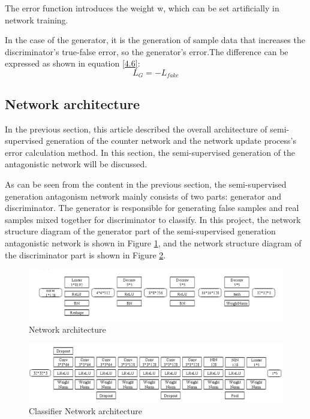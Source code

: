 \documentclass[11pt,en]{elegantpaper}
\begin{document}
The error function introduces the weight w, which can be set artificially in network training.

In the case of the generator, it is the generation of sample data that increases the discriminator's true-false error, so the generator's error.The difference can be expressed as shown in equation \ref{4.6}:
\begin{equation}
	L_G=-L_{fake} \label{4.6}
\end{equation}

\subsection{Network architecture}
In the previous section, this article described the overall architecture of semi-supervised generation of the counter network and the network update process's error calculation method. In this section, the semi-supervised generation of the antagonistic network will be discussed.

As can be seen from the content in the previous section, the semi-supervised generation antagonism network mainly consists of two parts: generator and discriminator. The generator is responsible for generating false samples and real samples mixed together for discriminator to classify. In this project, the network structure diagram of the generator part of the semi-supervised generation antagonistic network is shown in Figure \ref{f4.2}, and the network structure diagram of the discriminator part is shown in Figure \ref{f4.3}.
\begin{figure}[H]
    \centering
	\includegraphics[scale=0.6]{figure/5.2.png}
	\caption{Network architecture}
	\label{f4.2}
\end{figure}
\begin{figure}[H]
    \centering
	\includegraphics[scale=0.6]{figure/5.3.png}  
	\caption{Classifier Network architecture}
	\label{f4.3}
\end{figure}
\end{document}
